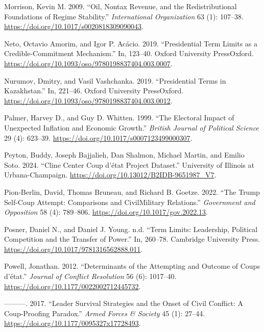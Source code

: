 \documentclass[
  12pt,
]{report}
\newlength{\cslhangindent}
\newenvironment{CSLReferences}[2] %
 {\begin{list}{}{%
  \setlength{\itemindent}{0pt}
  \setlength{\leftmargin}{0pt}
  \setlength{\parsep}{0pt}
  \ifodd #1
   \setlength{\leftmargin}{\cslhangindent}
   \setlength{\itemindent}{-1\cslhangindent}
  \fi
  \setlength{\itemsep}{#2\baselineskip}}}
 {\end{list}}
\begin{document}
\begin{CSLReferences}{1}{0}
Morrison, Kevin M. 2009. {``Oil, Nontax Revenue, and the
Redistributional Foundations of Regime Stability.''} \emph{International
Organization} 63 (1): 107--38.
\url{https://doi.org/10.1017/s0020818309090043}.

Neto, Octavio Amorim, and Igor P. Acácio. 2019. {``Presidential Term
Limits as a Credible-Commitment Mechanism.''} In, 123--40. Oxford
University PressOxford.
\url{https://doi.org/10.1093/oso/9780198837404.003.0007}.

Nurumov, Dmitry, and Vasil Vashchanka. 2019. {``Presidential Terms in
Kazakhstan.''} In, 221--46. Oxford University PressOxford.
\url{https://doi.org/10.1093/oso/9780198837404.003.0012}.

Palmer, Harvey D., and Guy D. Whitten. 1999. {``The Electoral Impact of
Unexpected Inflation and Economic Growth.''} \emph{British Journal of
Political Science} 29 (4): 623--39.
\url{https://doi.org/10.1017/s0007123499000307}.

Peyton, Buddy, Joseph Bajjalieh, Dan Shalmon, Michael Martin, and Emilio
Soto. 2024. {``Cline Center Coup d{'}état Project Dataset.''} University
of Illinois at Urbana-Champaign.
\url{https://doi.org/10.13012/B2IDB-9651987_V7}.

Pion-Berlin, David, Thomas Bruneau, and Richard B. Goetze. 2022. {``The
Trump Self-Coup Attempt: Comparisons and Civil{\textendash}Military
Relations.''} \emph{Government and Opposition} 58 (4): 789--806.
\url{https://doi.org/10.1017/gov.2022.13}.

Posner, Daniel N., and Daniel J. Young. n.d. {``Term Limits: Leadership,
Political Competition and the Transfer of Power.''} In, 260--78.
Cambridge University Press.
\url{https://doi.org/10.1017/9781316562888.011}.

Powell, Jonathan. 2012. {``Determinants of the Attempting and Outcome of
Coups d{'}état.''} \emph{Journal of Conflict Resolution} 56 (6):
1017--40. \url{https://doi.org/10.1177/0022002712445732}.

---------. 2017. {``Leader Survival Strategies and the Onset of Civil
Conflict: A Coup-Proofing Paradox.''} \emph{Armed Forces \& Society} 45
(1): 27--44. \url{https://doi.org/10.1177/0095327x17728493}.


\end{CSLReferences}
\end{document}
